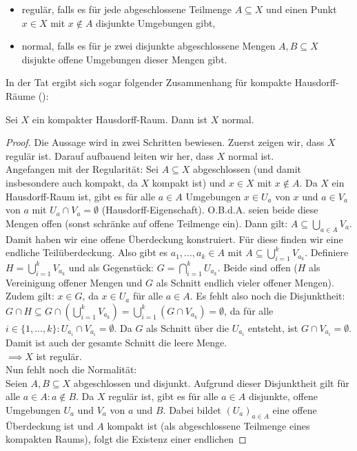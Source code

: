 \documentclass[11pt]{scrartcl}
\begin{document}
{\begin{definition}
\begin{itemize}
		\item regulär, falls es für jede abgeschlossene Teilmenge $ A \subseteq X$ und einen Punkt $x\in X$ mit $x\notin A$ disjunkte Umgebungen gibt,
		\item normal, falls es für je zwei disjunkte abgeschlossene Mengen $A,B \subseteq X$ disjukte offene Umgebungen dieser Mengen gibt.
	\end{itemize}
\end{definition}
\noindent In der Tat ergibt sich sogar folgender Zusammenhang für kompakte Hausdorff-Räume (\cite{Top2}):
\begin{theorem}
	Sei $X$ ein kompakter Hausdorff-Raum. Dann ist $X$ normal.
\end{theorem}
\begin{proof}
	Die Aussage wird in zwei Schritten bewiesen. Zuerst zeigen wir, dass $X$ regulär ist. Darauf aufbauend leiten wir her, dass $X$ normal ist.\\
	Angefangen mit der Regularität:
	Sei $ A \subseteq X$ abgeschlossen (und damit insbesondere auch kompakt, da $X$ kompakt ist) und $x\in X$ mit $x\notin A$. Da $X$ ein Hausdorff-Raum ist, gibt es für alle $a\in A$ Umgebungen 
	$x\in U_a$ von $x$ und $a\in V_a$ von $a$ mit
	$U_a \cap V_a =\emptyset$ (Hausdorff-Eigenschaft). O.B.d.A. seien beide diese Mengen offen (sonst schränke auf offene Teilmenge ein). Dann gilt: $ A \subseteq \bigcup_{a\in A} V_a$.
	Damit haben wir eine offene Überdeckung konstruiert. Für diese finden wir eine endliche Teilüberdeckung. Also gibt es $a_1,...,a_k \in A$ mit $ A \subseteq \bigcup_{i=1}^k V_{a_k}$.
	Definiere $H=\bigcup_{i=1}^k V_{a_k}$ und als Gegenstück: $G = \bigcap_{i=1}^k U_{a_k}$. Beide sind offen ($H$ als Vereinigung offener Mengen und $G$ als Schnitt endlich vieler offener
	Mengen). Zudem gilt: $x\in G$, da $x\in U_{a}$ für alle $a\in A$. Es fehlt also noch die Disjunktheit: $ G \cap H \subseteq G \cap (\bigcup_{i=1}^k V_{a_k}) = \bigcup_{i=1}^k (G \cap V_{a_k})=\emptyset$,
	da für alle $i \in \{1,...,k\}: U_{a_i}\cap V_{a_i} =\emptyset$. Da $G$ als Schnitt über die $U_{a_i}$ entsteht, ist $G\cap V_{a_i} =\emptyset$. Damit ist auch der gesamte Schnitt die leere Menge.\\
	$\implies X$ ist regulär.\\
	Nun fehlt noch die Normalität:\\
	Seien $ A,B \subseteq X$ abgeschlossen und disjunkt. Aufgrund dieser Disjunktheit gilt für alle $a\in A: a\notin B$. Da $X$ regulär ist, gibt es für alle $a\in A$ disjunkte, offene Umgebungen $U_a$ 
	und $V_a$ von $a$ und $B$. Dabei bildet $(U_a)_{a\in A}$ eine offene Überdeckung ist und $A$ kompakt ist (als abgeschlossene Teilmenge eines kompakten Raums), folgt die Existenz einer endlichen

\end{proof}}
\end{document}
